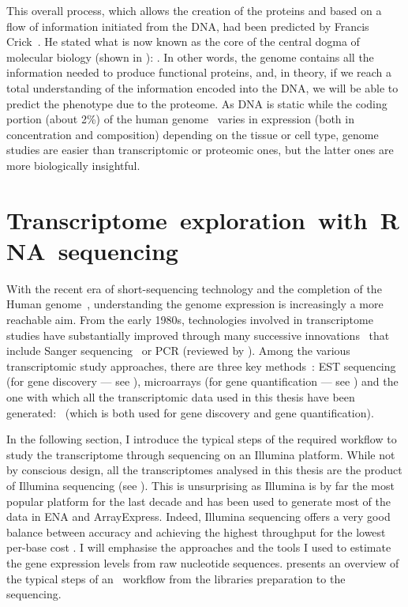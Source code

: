 This overall process, which allows the creation of the proteins and
based on a flow of information initiated from the \gls{DNA},
had been predicted by Francis Crick~.
He stated what is now known as the core of the central dogma of molecular biology
(shown in ):
.
In other words, the genome contains all the information needed to produce
functional proteins,
and, in theory, if we reach a total understanding of the information encoded
into the \gls{DNA},
we will be able to predict the \gls{phenotype} due to the proteome.
As \gls{DNA} is static
while the coding portion (about 2\%) of the human genome~
varies in expression (both in concentration and composition)
depending on the tissue or cell type,
genome studies are easier than transcriptomic or proteomic ones,
but the latter ones are more biologically insightful.\mybr\

\section[Transcriptome exploration with RNA sequencing]%
{Transcriptome~exploration~with~RNA~sequencing}\label{sec:transExplo}

With the recent era of short-sequencing technology and the completion of the
Human genome~,
understanding the genome expression is increasingly a more
reachable aim.
From the early 1980s,
technologies involved in transcriptome studies
have substantially improved through many successive innovations~
that include Sanger sequencing~ or
\gls{PCR} (reviewed by \citet{VanGuilder2008-xs}).
Among the various transcriptomic study approaches,
there are three key methods~:
\gls{EST} sequencing (for gene discovery --- see ),
microarrays (for gene quantification --- see )
and the one with which all the transcriptomic data used in this thesis have
been generated:
\Rnaseq\ (which is both used for gene discovery and gene quantification).\mybr\

In the following section,
I introduce the typical steps of the required workflow
to study the transcriptome through sequencing on an Illumina platform.
While not by conscious design, all the transcriptomes analysed in this thesis are
the product of Illumina sequencing (see
).
This is unsurprising as Illumina is by far
the most popular platform for the last decade  and
has been used to generate most of the data in \gls{ENA} and \gls{ArrayExpress}.
Indeed, Illumina sequencing offers a very
good balance between accuracy and achieving the highest
throughput for the lowest per-base cost .
I will emphasise the approaches and
the tools I used to estimate the gene expression levels from raw nucleotide
sequences.
 presents an overview of the typical steps of an
\Rnaseq\ workflow from the libraries preparation to the sequencing.\mybr\

